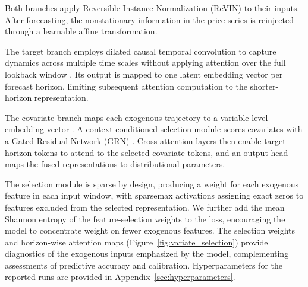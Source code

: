 \documentclass[a4paper,fleqn]{cas-sc}
\begin{document}
Both branches apply Reversible Instance Normalization (ReVIN) \citep{revin} to their inputs. After forecasting, the nonstationary information in the price series is reinjected through a learnable affine transformation. 

The target branch employs dilated causal temporal convolution to capture dynamics across multiple time scales without applying attention over the full lookback window \citep{oord2016wavenet,bai2018tcn,chen2020deeptcn,moreno2024deepvol,chen2024financialcrisis_tcn}. Its output is mapped to one latent embedding vector per forecast horizon, limiting subsequent attention computation to the shorter-horizon representation.

The covariate branch maps each exogenous trajectory to a variable-level embedding vector \citep{itransformer}. A context-conditioned selection module scores covariates with a Gated Residual Network (GRN) \citep{TFT}. Cross-attention layers then enable target horizon tokens to attend to the selected covariate tokens, and an output head maps the fused representations to distributional parameters. 

The selection module is sparse by design, producing a weight for each exogenous feature in each input window, with sparsemax activations assigning exact zeros to features excluded from the selected representation. We further add the mean Shannon entropy of the feature-selection weights to the loss, encouraging the model to concentrate weight on fewer exogenous features. The selection weights and horizon-wise attention maps (Figure~\ref{fig:variate_selection}) provide diagnostics of the exogenous inputs emphasized by the model, complementing assessments of predictive accuracy and calibration. Hyperparameters for the reported runs are provided in Appendix~\ref{sec:hyperparameters}.
\end{document}
